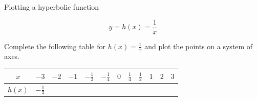 \begin{wex}
{Plotting a hyperbolic function}
{
\begin{equation*}
 y = h(x) = \frac{1}{x}
\end{equation*}

Complete the following table for $h(x) = \frac{1}{x}$ and plot the points on a system of axes.


\begin{table}[H]
\begin{center}
\begin{tabular}{|c|c|c|c|c|c|c|c|c|c|c|c|}
\hline
  $x$ &  $-3$ & $-2$ & $-1$ & $-\frac{1}{2}$ & $-\frac{1}{4}$ &$0$&$\frac{1}{4}$&$\frac{1}{2}$&$1$&$2$&$3$
\\ \hline
 $h(x)$& $-\frac{1}{3}$ &&&&&&&&&&
\\ \hline
\end{tabular}
\end{center}
\end{table}


}
\end{wex}
